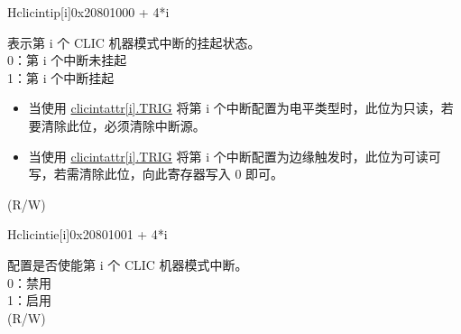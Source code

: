 \begin{register}{H}{{clicintip[i]}}{0x20801000 + 4*i}\label{regdesc:MCLICINTIP_REG_i}
%
%
\regnewline%
\begin{regdesc}
\begin{reglist}
\label{fielddesc:MCLICINTIP_i}\item [{IP[i]}] 表示第 i 个 CLIC 机器模式中断的挂起状态。 \\
0：第 i 个中断未挂起 \\
1：第 i 个中断挂起 \\
\begin{itemize}
    \item 当使用 \hyperref[fielddesc:MCLICINTATTR_i_TRIG]{clicintattr[i].TRIG} 将第 i 个中断配置为电平类型时，此位为只读，若要清除此位，必须清除中断源。\\
    \item 当使用 \hyperref[fielddesc:MCLICINTATTR_i_TRIG]{clicintattr[i].TRIG} 将第 i 个中断配置为边缘触发时，此位为可读可写，若需清除此位，向此寄存器写入 0 即可。\\
\end{itemize}
(R/W)
\end{reglist}
\end{regdesc}
\end{register}

\begin{register}{H}{{clicintie[i]}}{0x20801001 + 4*i}\label{regdesc:MCLICINTIE_REG_i}
%
%
\regnewline%
\begin{regdesc}
\begin{reglist}
\label{fielddesc:MCLICINTIE_i}\item [{IE[i]}] 配置是否使能第 i 个 CLIC 机器模式中断。\\
0：禁用 \\
1：启用 \\
(R/W) \\
\end{reglist}
\end{regdesc}
\end{register}

